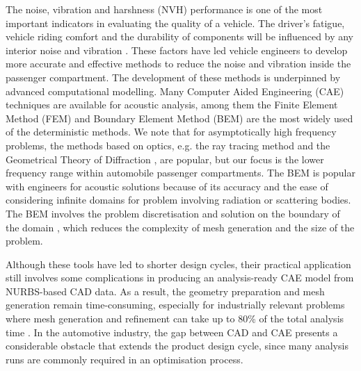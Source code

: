 \documentclass[review]{elsarticle}
\begin{document}


The noise, vibration and harshness (NVH) performance is one of the most important indicators in evaluating the quality of a vehicle. The driver's fatigue, vehicle riding comfort and the durability of components will be influenced by any interior noise and vibration \cite{Morello2011,HUSSAIN1994197}. These factors have led vehicle engineers to develop more accurate and effective methods to reduce the noise and vibration inside the passenger compartment. The development of these methods is underpinned by advanced computational modelling. Many Computer Aided Engineering (CAE) techniques are available for acoustic analysis, among them the Finite Element Method (FEM) \cite{Lonny,Zienkiewicz} and Boundary Element Method (BEM) \cite{Brebbia,He,Franzoni,Banerjee,Wu} are the most widely used of the deterministic methods. We note that for asymptotically high frequency problems, the methods based on optics, e.g. the ray tracing method \cite{KROKSTAD1968118,LeBot} and the Geometrical Theory of Diffraction \cite{Keller62,Tsingos2001}, are popular, but our focus is the lower frequency range within automobile passenger compartments. The BEM is popular with engineers for acoustic solutions because of its accuracy and the ease of considering infinite domains for problem involving radiation or scattering bodies. The BEM involves the problem discretisation and solution on the boundary of the domain \cite{Kirkup,Wrobel,Becker}, which reduces the complexity of mesh generation and the size of the problem.

Although these tools have led to shorter design cycles, their practical application still involves some complications in producing an analysis-ready CAE model from NURBS-based CAD data. As a result, the geometry preparation and mesh generation remain time-consuming, especially for industrially relevant problems where mesh generation and refinement can take up to 80\% of the total analysis time \cite{Hughes}. In the automotive industry, the gap between CAD and CAE presents a considerable obstacle that extends the product design cycle, since many analysis runs are commonly required in an optimisation process. %
\end{document}
